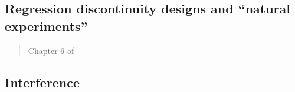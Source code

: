\documentclass[12pt]{article}
\begin{document}
\subsection{Regression discontinuity designs and ``natural experiments''} \label{sec:nat_exp}

\begin{verse}  \end{verse}

\begin{verse}  \end{verse}

\begin{verse}  \end{verse}

\begin{verse}  \end{verse}

\begin{verse}  \end{verse}

\begin{verse}  \end{verse}

\begin{verse}  \end{verse}

\begin{verse}  \end{verse}

\begin{verse}  \end{verse}

\begin{verse}  \end{verse}

\begin{verse}  \end{verse}

\begin{verse}  \end{verse}

\begin{verse} Chapter 6 of  \end{verse}

\subsection{Interference}
\end{document}
